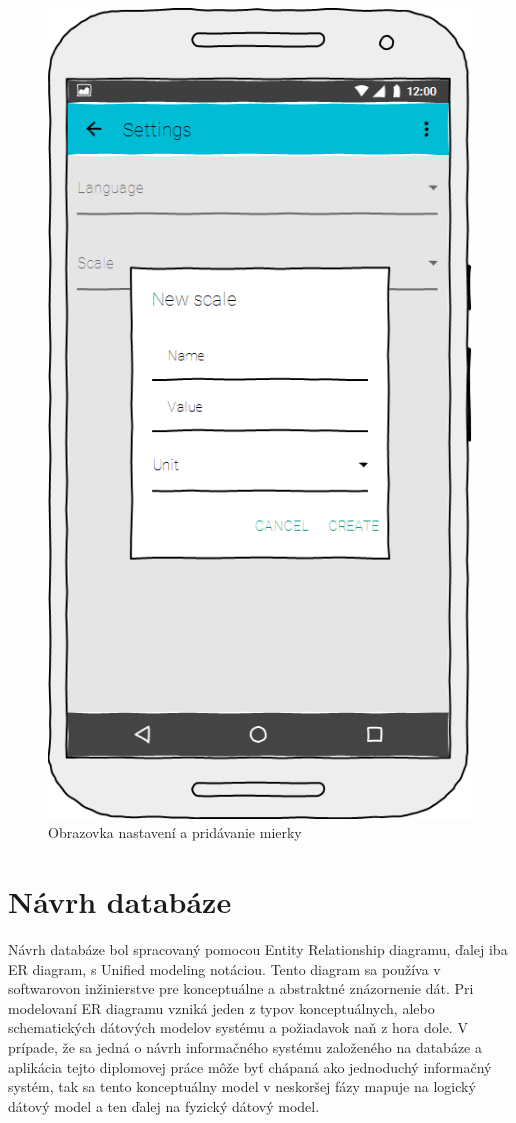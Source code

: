 \begin{figure}[h]
   \begin {minipage}{0.48\textwidth}
     \centering
     \includegraphics[scale=0.45]{fig/mockup3.png}
      \caption{Obrazovka nastavení a pridávanie mierky}
      \label{fig:mockup3}
   \end{minipage}
\end{figure}
\newpage

\section{Návrh databáze}
Návrh databáze bol spracovaný pomocou Entity Relationship diagramu, ďalej iba ER diagram, s Unified modeling notáciou. Tento diagram sa používa v softwarovon inžinierstve pre konceptuálne a abstraktné znázornenie dát. Pri modelovaní ER diagramu vzniká jeden z typov konceptuálnych, alebo schematických dátových modelov systému a požiadavok naň z hora dole. V prípade, že sa jedná o návrh informačného systému založeného na databáze a aplikácia tejto diplomovej práce môže byť chápaná ako jednoduchý informačný systém, tak sa tento konceptuálny model v neskoršej fázy mapuje na logický dátový model a ten ďalej na fyzický dátový model.

